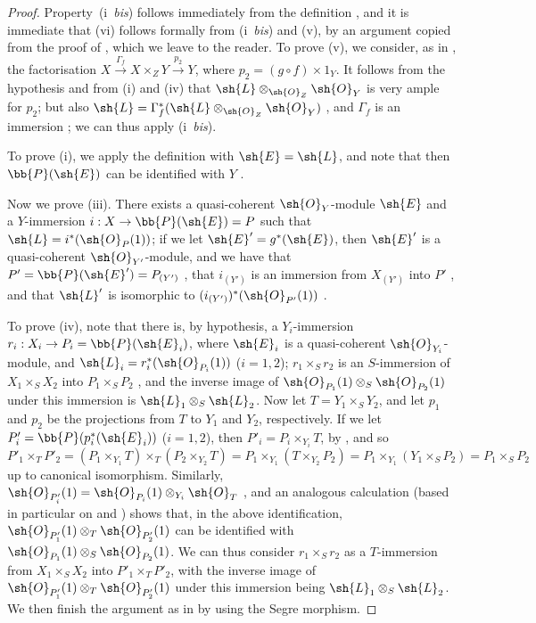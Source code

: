 \begin{proof}
Property~(i~\emph{bis}) follows immediately from the definition , and it is immediate that (vi) follows formally from (i~\emph{bis}) and (v), by an argument copied from the proof of , which we leave to the reader.
To prove (v), we consider, as in , the factorisation $X\xrightarrow{\Gamma_f}X\times_Z Y\xrightarrow{p_2}Y$, where $p_2=(g\circ f)\times1_Y$.
It follows from the hypothesis and from (i) and (iv) that $\sh{L}\otimes_{\sh{O}_Z}\sh{O}_Y$ is very ample for $p_2$;
but also $\sh{L}=\Gamma_f^*(\sh{L}\otimes_{\sh{O}_Z}\sh{O}_Y)$ , and $\Gamma_f$ is an immersion ;
we can thus apply (i~\emph{bis}).

To prove (i), we apply the definition  with $\sh{E}=\sh{L}$, and note that then $\bb{P}(\sh{E})$ can be identified with $Y$ .

Now we prove (iii).
There exists a quasi-coherent $\sh{O}_Y$-module $\sh{E}$ and a $Y$-immersion $i:X\to\bb{P}(\sh{E})=P$ such that $\sh{L}=i^*(\sh{O}_P(1))$;
if we let $\sh{E}'=g^*(\sh{E})$, then $\sh{E}'$ is a quasi-coherent $\sh{O}_{Y'}$-module, and we have that $P'=\bb{P}(\sh{E}')=P_{(Y')}$ , that $i_{(Y')}$ is an immersion from $X_{(Y')}$ into $P'$ , and that $\sh{L}'$ is isomorphic to $(i_{(Y')})^*(\sh{O}_{P'}(1))$ .

To prove (iv), note that there is, by hypothesis, a $Y_i$-immersion $r_i:X_i\to P_i=\bb{P}(\sh{E}_i)$, where $\sh{E}_i$ is a quasi-coherent $\sh{O}_{Y_i}$-module, and $\sh{L}_i=r_i^*(\sh{O}_{P_i}(1))$ ($i=1,2$);
$r_1\times_S r_2$ is an $S$-immersion of $X_1\times_S X_2$ into $P_1\times_S P_2$ , and the inverse image of $\sh{O}_{P_1}(1)\otimes_S\sh{O}_{P_2}(1)$ under this immersion is $\sh{L}_1\otimes_S\sh{L}_2$.
Now let $T=Y_1\times_S Y_2$, and let $p_1$ and $p_2$ be the projections from $T$ to $Y_1$ and $Y_2$, respectively.
If we let $P'_i=\bb{P}(p_i^*(\sh{E}_i))$ ($i=1,2$), then $P'_i=P_i\times_{Y_i}T$, by , and so
\[
  P'_1\times_T P'_2
  = (P_1\times_{Y_1}T)\times_T(P_2\times_{Y_2}T)
  = P_1\times_{Y_1}(T\times_{Y_2}P_2)
  = P_1\times_{Y_1}(Y_1\times_S P_2)
  = P_1\times_S P_2
\]
up to canonical isomorphism.
Similarly, $\sh{O}_{P'_i}(1)=\sh{O}_{P_i}(1)\otimes_{Y_i}\sh{O}_T$ , and an analogous calculation (based in particular on  and ) shows that, in the above identification, $\sh{O}_{P'_1}(1)\otimes_T\sh{O}_{P'_2}(1)$ can be identified with $\sh{O}_{P_1}(1)\otimes_S\sh{O}_{P_2}(1)$.
We can thus consider $r_1\times_S r_2$ as a $T$-immersion from $X_1\times_S X_2$ into $P'_1\times_T P'_2$, with the inverse image of $\sh{O}_{P'_1}(1)\otimes_T\sh{O}_{P'_2}(1)$ under this immersion being $\sh{L}_1\otimes_S\sh{L}_2$.
We then finish the argument as in  by using the Segre morphism.


\end{proof}
